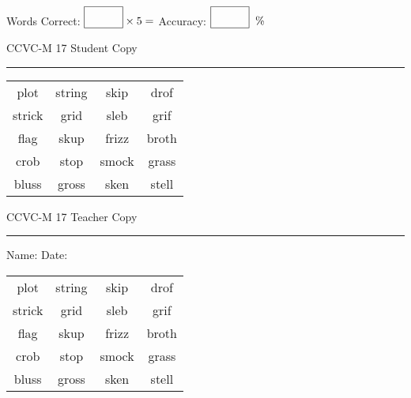 \documentclass{memoir}
\begin{document}
\small

Words Correct: $\fbox{\phantom{\huge 100}} \times 5 = $ Accuracy: $\fbox{\phantom{\huge 100}}\;\; \%$ 

\vfill

\newpage


\footnotesize \noindent
CCVC-M 17 \hfill Student Copy
\smallskip
\hrule

\Large

\setlength{\tabcolsep}{14pt}
\def\arraystretch{3}

{\selectfont


\begin{vplace}[0.5]
\begin{center}
\begin{tabular}{cccc}
plot & string & skip & drof \\
strick & grid & sleb             & grif      \\
flag             & skup & frizz & broth    \\
crob & stop & smock & grass                    \\
bluss & gross                    & sken & stell \\
\end{tabular}
\end{center}
\end{vplace}

}

\newpage

\footnotesize \noindent
CCVC-M 17 \hfill Teacher Copy
\smallskip
\hrule

\small

\vfill

\noindent
Name: \underline{\hspace{1.75in}} \hfill Date: \underline{\hspace{1in}}

\Large

{\selectfont


\begin{vplace}[0.5]
\begin{center}
\begin{tabular}{cccc}
plot & string & skip & drof \\
strick & grid & sleb             & grif      \\
flag             & skup & frizz & broth    \\
crob & stop & smock & grass                    \\
bluss & gross                    & sken & stell \\
\end{tabular}
\end{center}
\end{vplace}



}
\end{document}
